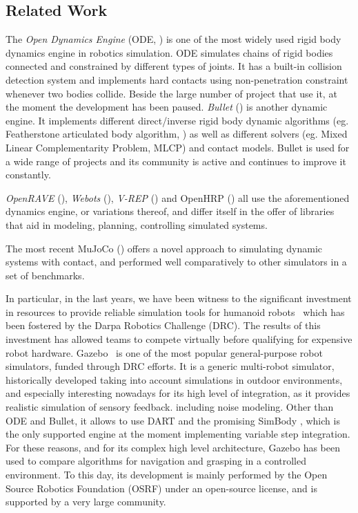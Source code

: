 \subsection{Related Work}\label{related_work_simulators}
The \emph{Open Dynamics Engine} (ODE, \cite{opende}) is one of the most widely used rigid body dynamics engine in robotics simulation. ODE simulates chains of rigid bodies connected and constrained by different types of joints. It has a built-in collision detection system and implements hard contacts using non-penetration constraint whenever two bodies collide. Beside the large number of project that use it, at the moment the development has been paused. \emph{Bullet} (\cite{bulletpe}) is another dynamic engine. It implements different direct/inverse rigid body dynamic algorithms (eg. Featherstone articulated body algorithm, \cite{Featherstone:2007:RBD:1324846}) as well as different solvers (eg. Mixed Linear Complementarity Problem, MLCP) and contact models. Bullet is used for a wide range of projects and its community is active and continues to improve it constantly.

\emph{OpenRAVE} (\cite{diankovthesis}), \emph{Webots}  (\cite{Michel04cyberboticsltd}), \emph{V-REP} (\cite{conf/iros/RohmerSF13}) and OpenHRP  (\cite{journals/ijrr/KanehiroHK04}) all use the aforementioned dynamics engine, or variations thereof, and differ itself in the offer of libraries that aid in modeling, planning, controlling simulated systems.

The most recent MuJoCo (\cite{conf/iros/TodorovET12}) offers a novel approach to simulating dynamic systems with contact, and performed well comparatively to other simulators in a set of benchmarks\cite{erez15}.

In particular, in the last years, we have been witness to the significant investment in resources to provide reliable simulation tools for humanoid robots~\cite{Hsu14} which has been fostered by the Darpa Robotics Challenge (DRC). The results of this investment has allowed teams to compete virtually before qualifying for expensive robot hardware.  
Gazebo~\cite{koenig2004design} is one of the most popular general-purpose robot simulators, funded through DRC efforts.
It is a generic multi-robot simulator, historically developed taking into account simulations in outdoor environments, and especially interesting nowadays for its high level of integration, as it provides realistic simulation of sensory feedback. including noise modeling. Other than ODE and Bullet, it allows to use DART \cite{DART} and the promising SimBody \cite{Sherman2011241}, which is the only supported engine at the moment implementing variable step integration. For these reasons, and for its complex high level architecture, Gazebo has been used to compare algorithms for navigation and grasping in a controlled environment.
To this day, its development is mainly performed by the Open Source Robotics Foundation (OSRF) under an open-source license, and is supported by a very large community.

